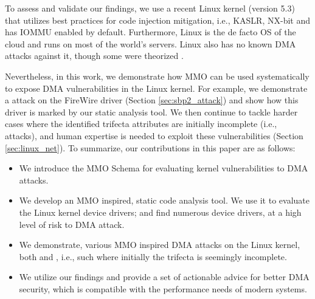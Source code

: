 To assess and validate our findings, we use a recent Linux kernel (version 5.3) that utilizes best practices for code injection mitigation, i.e., KASLR, NX-bit and has IOMMU enabled by default. Furthermore, Linux is the de facto OS of the cloud and runs on most of the world's servers. Linux also has no known DMA attacks against it, though some were theorized \cite{MMT16,thunder}. 

Nevertheless, in this work, we demonstrate how MMO can be used systematically to expose DMA vulnerabilities in the Linux kernel. For example, we demonstrate a \simple{} attack on the FireWire \spb{} driver (Section \ref{sec:sbp2_attack}) and show how this driver is marked by our static analysis tool. 
We then continue to tackle harder cases where the identified trifecta attributes are initially incomplete (i.e., \compound{} attacks), and human expertise is needed to exploit these vulnerabilities (Section \ref{sec:linux_net}). To summarize, our contributions in this paper are as follows:
\begin{itemize}
    \item We introduce the MMO Schema for evaluating kernel vulnerabilities to DMA attacks. 
    \item We develop an MMO inspired, static code analysis tool. We use it to evaluate the Linux kernel device drivers; and find numerous device drivers, at a high level of risk to DMA attack.
    \item We demonstrate, various MMO inspired DMA attacks on the Linux kernel, both \simple{} and \compound{}, i.e., such where initially the trifecta is seemingly incomplete. 
    \item We utilize our findings and provide a set of actionable advice for better DMA security, which is compatible with the performance needs of modern systems.
\end{itemize}
